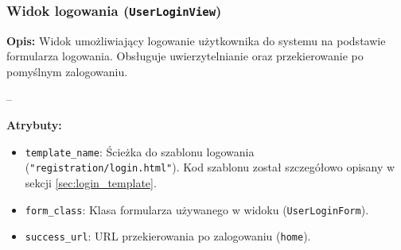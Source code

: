 \documentclass[12pt,a4paper,oneside]{article}
\theoremstyle{definition}
\numberwithin{equation}{section}
\begin{document}
\subsubsection*{Widok logowania (\texttt{UserLoginView})}

\textbf{Opis:}
Widok umożliwiający logowanie użytkownika do systemu na podstawie formularza logowania. Obsługuje uwierzytelnianie oraz przekierowanie po pomyślnym zalogowaniu.

--

\textbf{Atrybuty:}
\begin{itemize}
    \item \texttt{template\_name}: Ścieżka do szablonu logowania (\texttt{"registration/login.html"}).
    \subsubitem Kod szablonu został szczegółowo opisany w sekcji \ref{sec:login_template}.

    \item \texttt{form\_class}: Klasa formularza używanego w widoku (\texttt{UserLoginForm}).
    \item \texttt{success\_url}: URL przekierowania po zalogowaniu (\texttt{home}).
\end{itemize}
\end{document}
